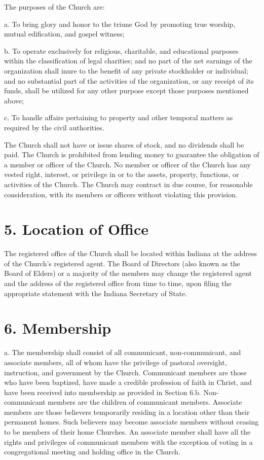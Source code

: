 \documentclass[
]{book}
\begin{document}
The purposes of the Church are:

a. To bring glory and honor to the triune God by promoting true worship, mutual edification, and gospel witness;

b. To operate exclusively for religious, charitable, and educational purposes within the classifica­tion of legal charities; and no part of the net earnings of the organization shall inure to the benefit of any private stockholder or individual; and no substantial part of the activities of the organization, or any receipt of its funds, shall be utilized for any other purpose except those purposes mentioned above;

c. To handle affairs pertaining to property and other temporal matters as required by the civil authorities.

The Church shall not have or issue shares of stock, and no dividends shall be paid. The Church is prohibited from lending money to guarantee the obligation of a member or officer of the Church. No member or officer of the Church has any vested right, interest, or privilege in or to the assets, property, functions, or activities of the Church. The Church may contract in due course, for reasonable consideration, with its members or officers without violating this provision.

\hypertarget{location-of-office}{%
\section{5. Location of Office}\label{location-of-office}}

The registered office of the Church shall be located within Indiana at the address of the Church's registered agent. The Board of Directors (also known as the Board of Elders) or a majority of the members may change the registered agent and the address of the registered office from time to time, upon filing the appropriate statement with the Indiana Secretary of State.

\hypertarget{membership}{%
\section{6. Membership}\label{membership}}

a. The membership shall consist of all communicant, non-communicant, and associate members, all of whom have the privilege of pastoral oversight, instruction, and government by the Church. Com­mun­icant members are those who have been baptized, have made a credible profession of faith in Christ, and have been received into membership as provided in Section 6.b. Non-communicant members are the children of communicant members. Associate members are those believers temporarily residing in a location other than their permanent homes. Such believers may become associate members without ceasing to be members of their home Churches. An associate member shall have all the rights and privileges of communicant members with the exception of voting in a congregational meeting and holding office in the Church.
\end{document}
